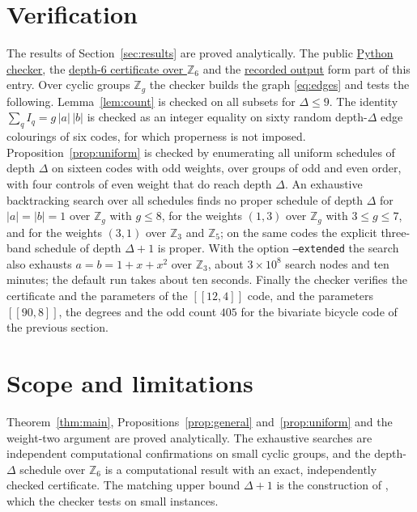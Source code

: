 \documentclass[11pt,a4paper]{article}
\theoremstyle{definition}
\theoremstyle{plain}
\begin{document}
\section{Verification}\label{sec:verification}
The results of Section~\ref{sec:results} are proved analytically. The public
\href{https://github.com/jpbruneton/open_quantum_problems/blob/main/research/entries/syndrome-schedule-parity/checks/check_syndrome_parity.py}{Python checker},
the
\href{https://github.com/jpbruneton/open_quantum_problems/blob/main/research/entries/syndrome-schedule-parity/data/even_order_schedule.json}{depth-6 certificate over $\mathbb{Z}_6$}
and the
\href{https://github.com/jpbruneton/open_quantum_problems/blob/main/research/entries/syndrome-schedule-parity/data/verification.json}{recorded output}
form part of this entry. Over cyclic groups $\mathbb{Z}_g$ the checker builds
the graph \eqref{eq:edges} and tests the following. Lemma~\ref{lem:count} is
checked on all subsets for $\Delta\le9$. The identity
$\sum_qI_q=g\,\lvert a\rvert\,\lvert b\rvert$ is checked as an integer equality
on sixty random depth-$\Delta$ edge colourings of six codes, for which
properness is not imposed. Proposition~\ref{prop:uniform} is checked by
enumerating all uniform schedules of depth $\Delta$ on sixteen codes with odd
weights, over groups of odd and even order, with four controls of even weight
that do reach depth $\Delta$. An exhaustive backtracking search over all
schedules finds no proper schedule of depth $\Delta$ for $\lvert a\rvert=\lvert b\rvert=1$
over $\mathbb{Z}_g$ with $g\le8$, for the weights $(1,3)$ over
$\mathbb{Z}_g$ with $3\le g\le7$, and for the weights $(3,1)$ over
$\mathbb{Z}_3$ and $\mathbb{Z}_5$;
on the same codes the explicit three-band schedule of depth $\Delta+1$ is
proper. With the option \texttt{--extended} the search also exhausts
$a=b=1+x+x^2$ over $\mathbb{Z}_3$, about $3\times10^{8}$ search nodes and ten
minutes; the default run takes about ten seconds. Finally the checker
verifies the certificate and the parameters of the $[[12,4]]$ code, and the
parameters $[[90,8]]$, the degrees and the odd count $405$ for the bivariate
bicycle code of the previous section.

\section{Scope and limitations}\label{sec:scope}
Theorem~\ref{thm:main}, Propositions~\ref{prop:general} and~\ref{prop:uniform}
and the weight-two argument are proved analytically. The exhaustive searches
are independent computational confirmations on small cyclic groups, and the
depth-$\Delta$ schedule over $\mathbb{Z}_6$ is a computational result with an
exact, independently checked certificate. The matching upper bound
$\Delta+1$ is the construction of \cite{NRB2026}, which the checker tests on
small instances.
\end{document}
